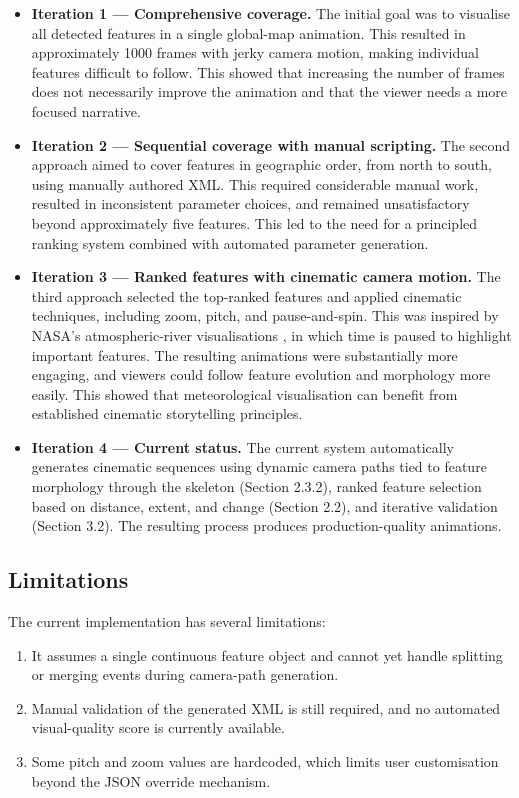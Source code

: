 \documentclass[journal abbreviation, manuscript]{copernicus}
\begin{document}
\begin{itemize}
\item \textbf{Iteration 1 --- Comprehensive coverage.}
The initial goal was to visualise all detected features in a single global-map animation. This resulted in approximately 1000 frames with jerky camera motion, making individual features difficult to follow. This showed that increasing the number of frames does not necessarily improve the animation and that the viewer needs a more focused narrative.

\item \textbf{Iteration 2 --- Sequential coverage with manual scripting.}
The second approach aimed to cover features in geographic order, from north to south, using manually authored XML. This required considerable manual work, resulted in inconsistent parameter choices, and remained unsatisfactory beyond approximately five features. This led to the need for a principled ranking system combined with automated parameter generation.

\item \textbf{Iteration 3 --- Ranked features with cinematic camera motion.}
The third approach selected the top-ranked features and applied cinematic techniques, including zoom, pitch, and pause-and-spin. This was inspired by NASA's atmospheric-river visualisations \citep{nasa-climate}, in which time is paused to highlight important features. The resulting animations were substantially more engaging, and viewers could follow feature evolution and morphology more easily. This showed that meteorological visualisation can benefit from established cinematic storytelling principles.

\item \textbf{Iteration 4 --- Current status.}
The current system automatically generates cinematic sequences using dynamic camera paths tied to feature morphology through the skeleton (Section 2.3.2), ranked feature selection based on distance, extent, and change (Section 2.2), and iterative validation (Section 3.2). The resulting process produces production-quality animations.
\end{itemize}

\subsection{Limitations}

The current implementation has several limitations:
\begin{enumerate}
\item It assumes a single continuous feature object and cannot yet handle splitting or merging events during camera-path generation.
\item Manual validation of the generated XML is still required, and no automated visual-quality score is currently available.
\item Some pitch and zoom values are hardcoded, which limits user customisation beyond the JSON override mechanism.
\end{enumerate}
\end{document}

